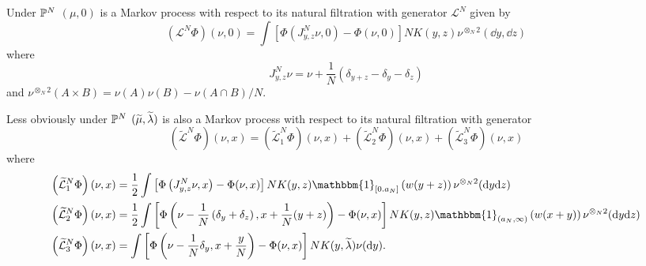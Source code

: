 \begin{proposition}
Under $\mathbb{P}^N$  $(\mu, 0)$ is a Markov process with respect to its natural filtration with generator $\mathcal{L}^N$ given by
\begin{equation}\label{eq:mu-generator}
    \left(\mathcal{L}^N \Phi\right)(\nu, 0)
    =
    \int\left[\Phi\left(J^N_{y,z}\nu, 0\right) - \Phi(\nu, 0)\right]NK(y,z)\nu^{\otimes_N 2}(\dd y,\dd z)
\end{equation}
where
\begin{equation}
    J^N_{y,z}\nu = \nu + \frac1N\left(\delta_{y+z} - \delta_y - \delta_z\right)
\end{equation}
and $\nu^{\otimes_N 2}(A \times B) = \nu(A)\nu(B) - \nu(A\cap B)/N$.
\end{proposition}

\begin{proposition}
Less obviously under $\mathbb{P}^N$ $(\widetilde{\mu}, \widetilde{\lambda})$ is also a Markov process with respect to its natural filtration with generator
\begin{equation}\label{eq:tmu-generator}
    \left(\widetilde{\mathcal{L}}^N \Phi\right)(\nu, x)
    =
    \left(\widetilde{\mathcal{L}}^N_1 \Phi\right)(\nu, x)
    +\left(\widetilde{\mathcal{L}}^N_2 \Phi\right)(\nu, x)
    +\left(\widetilde{\mathcal{L}}^N_3 \Phi\right)(\nu, x)
\end{equation}
where
\begin{align*}
    \left(\widetilde{\mathcal{L}}^N_1 \Phi\right)(\nu, x) &=
    \frac12\int\left[\Phi\left(J^N_{y,z}\nu, x\right) - \Phi(\nu, x)\right]
         NK(y,z)\mathbbm{1}_{[0.a_N]}\left(w(y+z)\right)\nu^{\otimes_N 2}(\dd y \dd z)\\
    \left(\widetilde{\mathcal{L}}^N_2 \Phi\right)(\nu, x) &=
    \frac12\int\left[\Phi\left(\nu - \frac1N \left(\delta_y + \delta _z\right), x + \frac1N(y+z)\right) - \Phi(\nu, x)\right]
         NK(y,z)\mathbbm{1}_{(a_N,\infty)}\left(w(x+y)\right)\nu^{\otimes_N 2}(\dd y \dd z)\\
    \left(\widetilde{\mathcal{L}}^N_3 \Phi\right)(\nu, x) &=
     \int\left[\Phi\left(\nu - \frac1N \delta_y , x + \frac{y}{N}\right) - \Phi(\nu, x)\right]
         NK(y,\tl)\nu(\dd y).
\end{align*}
\end{proposition}

